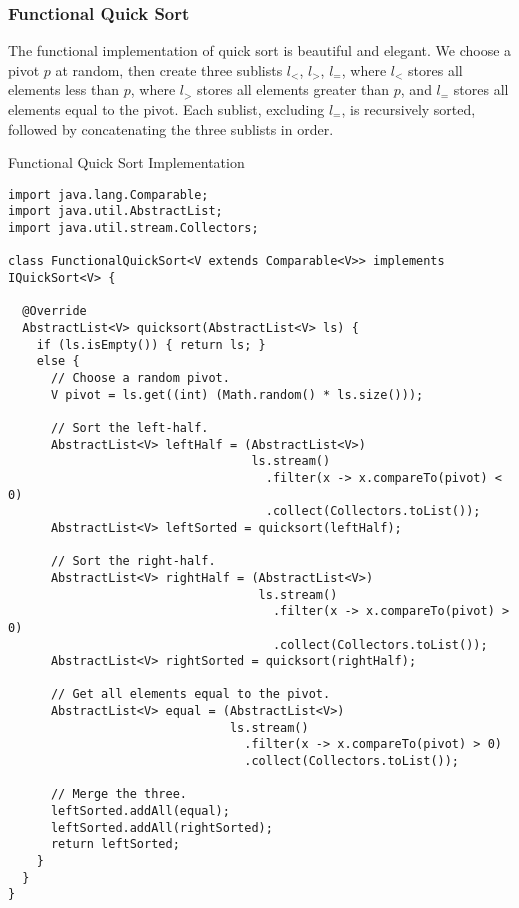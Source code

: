 \subsubsection*{Functional Quick Sort}
The functional implementation of quick sort is beautiful and elegant. We choose a pivot $p$ at random, then create three sublists $l_<$, $l_>$, $l_=$, where $l_<$ stores all elements less than $p$, where $l_>$ stores all elements greater than $p$, and $l_=$ stores all elements equal to the pivot. Each sublist, excluding $l_=$, is recursively sorted, followed by concatenating the three sublists in order. 

\begin{cl}[]{Functional Quick Sort Implementation}
\begin{lstlisting}[language=MyJava]
import java.lang.Comparable;
import java.util.AbstractList;
import java.util.stream.Collectors;

class FunctionalQuickSort<V extends Comparable<V>> implements IQuickSort<V> {

  @Override
  AbstractList<V> quicksort(AbstractList<V> ls) {
    if (ls.isEmpty()) { return ls; }
    else {
      // Choose a random pivot.
      V pivot = ls.get((int) (Math.random() * ls.size()));

      // Sort the left-half.
      AbstractList<V> leftHalf = (AbstractList<V>) 
                                  ls.stream()
                                    .filter(x -> x.compareTo(pivot) < 0)
                                    .collect(Collectors.toList());
      AbstractList<V> leftSorted = quicksort(leftHalf);

      // Sort the right-half.
      AbstractList<V> rightHalf = (AbstractList<V>) 
                                   ls.stream()
                                     .filter(x -> x.compareTo(pivot) > 0)
                                     .collect(Collectors.toList());
      AbstractList<V> rightSorted = quicksort(rightHalf);

      // Get all elements equal to the pivot.
      AbstractList<V> equal = (AbstractList<V>) 
                               ls.stream()
                                 .filter(x -> x.compareTo(pivot) > 0)
                                 .collect(Collectors.toList());

      // Merge the three.
      leftSorted.addAll(equal);
      leftSorted.addAll(rightSorted);
      return leftSorted;
    }
  }
}
\end{lstlisting}
\end{cl}

